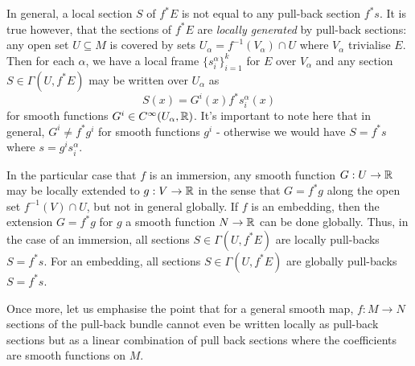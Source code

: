 \documentclass{amsart}
\begin{document}
\begin{rem}
In general, a local section \(S\) of \(f^{\ast} E\) is not equal to any pull-back section \(f^{\ast} s\). It is true however, that the sections of \(f^{\ast} E\) are \emph{locally generated} by pull-back sections: any open set \(U \subseteq M\) is covered by sets \(U_{\alpha} = f^{-1}(V_{\alpha}) \cap U\) where \(V_{\alpha}\) trivialise \(E\). Then for each \(\alpha\), we have a local frame \(\{s^{\alpha}_i\}_{i=1}^k\) for \(E\) over \(V_{\alpha}\) and any section \(S \in \Gamma(U, f^{\ast} E)\) may be written over \(U_{\alpha}\) as
\[
S(x) = G^i(x) f^{\ast} s^{\alpha}_i(x)
\]
for smooth functions \(G^i \in C^{\infty}(U_{\alpha}, \mathbb{R})\). It's important to note here that in general, \(G^i \ne f^{\ast} g^i\) for smooth functions \(g^i\) - otherwise we would have \(S = f^{\ast} s\) where \(s = g^i s^{\alpha}_i\).

In the particular case that \(f\) is an immersion, any smooth function \(G : U \to \mathbb{R}\) may be locally extended to \(g : V \to \mathbb{R}\) in the sense that \(G = f^{\ast} g\) along the open set \(f^{-1}(V) \cap U\), but not in general globally. If \(f\) is an embedding, then the extension \(G = f^{\ast} g\) for \(g\) a smooth function \(N \to \mathbb{R}\) can be done globally. Thus, in the case of an immersion, all sections \(S \in \Gamma(U, f^{\ast} E)\) are locally pull-backs \(S = f^{\ast} s\). For an embedding, all sections \(S \in \Gamma(U, f^{\ast} E)\) are globally pull-backs \(S = f^{\ast} s\).

Once more, let us emphasise the point that for a general smooth map, \(f: M \to N\) sections of the pull-back bundle cannot even be written locally as pull-back sections but as a linear combination of pull back sections where the coefficients are smooth functions on \(M\).
\end{rem}
\end{document}
